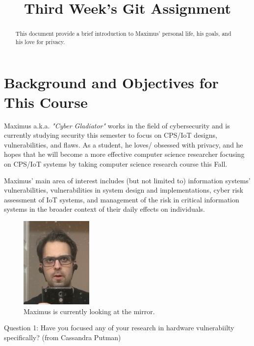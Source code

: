 


 \title{Third Week's Git Assignment} 

 \maketitle


\begin{abstract}
This document provide a brief introduction to Maximus' personal life, his goals, and his love for privacy.
\end{abstract}
\section{Background and Objectives for This Course}
Maximus a.k.a. \emph{"Cyber Gladiator"} works in the field of cybersecurity and is currently studying security this semester to focus on CPS/IoT designs, vulnerabilities, and flaws. As a student, he loves/ obsessed with privacy, and he hopes that he will become a more effective computer science researcher focusing on CPS/IoT systems by taking computer science research course this Fall.

Maximus' main area of interest includes (but not limited to) information systems’ vulnerabilities, vulnerabilities in system design and implementations, cyber risk assessment of IoT systems, and management of the risk in critical information systems in the broader context of their daily effects on individuals.


\begin{figure}[htbp]
\centerline{\includegraphics{a481.jpg}}
\caption{Maximus is currently looking at the mirror.}
\label{fig}
\end{figure}

Question 1: Have you focused any of your research in hardware vulnerabiilty specifically?  (from Cassandra Putman)  
